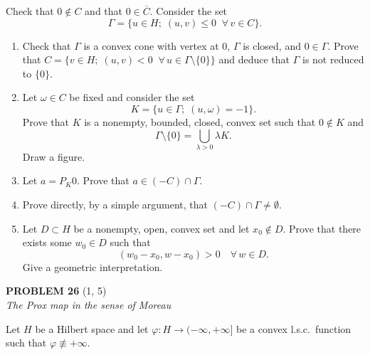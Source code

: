 \documentclass[12pt]{article}
\begin{document}
\medskip
 
\noindent Check that $0 \notin C$ and that $0 \in \overline{C}$. Consider the set
\[
\Gamma = \{u \in H;\; (u,v) \le 0\;\; \forall\, v \in C\}.
\]
 
\begin{enumerate}
\item Check that $\Gamma$ is a convex cone with vertex at $0$, $\Gamma$ is closed, and $0 \in \Gamma$.
Prove that $C = \{v \in H;\; (u,v) < 0\;\; \forall\, u \in \Gamma \setminus \{0\}\}$ and deduce that
$\Gamma$ is not reduced to $\{0\}$.
 
 
\item Let $\omega \in C$ be fixed and consider the set
\[
K = \{u \in \Gamma;\; (u,\omega) = -1\}.
\]
Prove that $K$ is a nonempty, bounded, closed, convex set such that $0 \notin K$ and
\[
\Gamma \setminus \{0\} = \bigcup_{\lambda > 0} \lambda K.
\]
Draw a figure.
 
 
\item Let $a = P_K 0$. Prove that $a \in (-C) \cap \Gamma$.
 
\item Prove directly, by a simple argument, that $(-C) \cap \Gamma \neq \emptyset$.
 
\item Let $D \subset H$ be a nonempty, open, convex set and let $x_0 \notin D$. Prove that there
exists some $w_0 \in D$ such that
\[
(w_0 - x_0, w - x_0) > 0 \quad \forall\, w \in D.
\]
Give a geometric interpretation.
 
\noindent[\textit{Hint:} Consider the set $C = \bigcup_{\mu > 0} \mu(D - x_0)$.]
\end{enumerate}
 
\bigskip
 
\noindent\textbf{PROBLEM 26} (1, 5)\\[4pt]
\textit{The Prox map in the sense of Moreau}
 
\medskip
 
Let $H$ be a Hilbert space and let $\varphi : H \to (-\infty,+\infty]$ be a convex l.s.c.\ function
such that $\varphi \not\equiv +\infty$.
 
\end{document}

